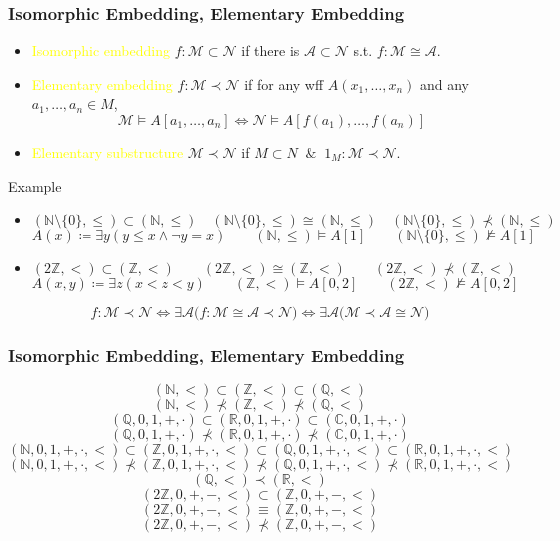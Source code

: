 \documentclass[UTF8,11pt,colorlinks,compress,openany]{beamer}%
\begin{document}
\begin{frame}\frametitle{Isomorphic Embedding, Elementary Embedding}
\setlength\abovedisplayskip{0pt}
\setlength\belowdisplayskip{0pt}
\begin{definition}
\begin{itemize}
	\item \textcolor{yellow}{Isomorphic embedding} $f:\mathcal{M}\subset\mathcal{N}$ if there is $\mathcal{A}\subset\mathcal{N}$ s.t. $f:\mathcal{M}\cong\mathcal{A}$.
	\item \textcolor{yellow}{Elementary embedding} $f:\mathcal{M}\prec\mathcal{N}$ if for any wff $A(x_1,\dots,x_n)$ and any $a_1,\dots,a_n\in M$,
	\[\mathcal{M}\vDash A[a_1,\dots,a_n]\iff\mathcal{N}\vDash A[f(a_1),\dots,f(a_n)]\]
	\item \textcolor{yellow}{Elementary substructure} $\mathcal{M}\prec\mathcal{N}$ if $M\subset N\;\;\&\;\;1_M:\mathcal{M}\prec\mathcal{N}$.
\end{itemize}
\end{definition}
\begin{block}{Example}
\begin{itemize}
	\item $(\mathbb{N}\setminus\{0\},\leq)\subset(\mathbb{N},\leq)\quad(\mathbb{N}\setminus\{0\},\leq)\cong(\mathbb{N},\leq)\quad(\mathbb{N}\setminus\{0\},\leq)\nprec(\mathbb{N},\leq)$
\[A(x)\coloneqq \exists y(y\leq x\wedge\neg y=x)\qquad(\mathbb{N},\leq)\vDash A[1]\qquad (\mathbb{N}\setminus\{0\},\leq)\nvDash A[1]\]
	\item $(2\mathbb{Z},<)\subset (\mathbb{Z},<)\qquad(2\mathbb{Z},<)\cong(\mathbb{Z},<)\qquad(2\mathbb{Z},<)\nprec(\mathbb{Z},<)$
	\[A(x,y)\coloneqq \exists z(x<z<y)\qquad(\mathbb{Z},<)\vDash A[0,2]\qquad(2\mathbb{Z},<)\nvDash A[0,2]\]
\end{itemize}
\end{block}
\[f:\mathcal{M}\prec\mathcal{N}\iff \exists \mathcal{A}\big(f:\mathcal{M}\cong\mathcal{A}\prec \mathcal{N}\big)\iff\exists \mathcal{A}\big(\mathcal{M}\prec\mathcal{A}\cong\mathcal{N}\big)\]
\end{frame}

\begin{frame}\frametitle{Isomorphic Embedding, Elementary Embedding}
\[(\mathbb{N},<)\subset(\mathbb{Z},<)\subset(\mathbb{Q},<)\]
\[(\mathbb{N},<)\nprec(\mathbb{Z},<)\nprec(\mathbb{Q},<)\]
\[(\mathbb{Q},0,1,+,\cdot)\subset(\mathbb{R},0,1,+,\cdot)\subset(\mathbb{C},0,1,+,\cdot)\]
\[(\mathbb{Q},0,1,+,\cdot)\nprec(\mathbb{R},0,1,+,\cdot)\nprec(\mathbb{C},0,1,+,\cdot)\]
\[(\mathbb{N},0,1,+,\cdot,<)\subset(\mathbb{Z},0,1,+,\cdot,<)\subset(\mathbb{Q},0,1,+,\cdot,<)\subset(\mathbb{R},0,1,+,\cdot,<)\]
\[(\mathbb{N},0,1,+,\cdot,<)\nprec(\mathbb{Z},0,1,+,\cdot,<)\nprec(\mathbb{Q},0,1,+,\cdot,<)\nprec(\mathbb{R},0,1,+,\cdot,<)\]
\[(\mathbb{Q},<)\prec(\mathbb{R},<)\]
\[(2\mathbb{Z},0,+,-,<)\subset(\mathbb{Z},0,+,-,<)\]
\[(2\mathbb{Z},0,+,-,<)\equiv(\mathbb{Z},0,+,-,<)\]
\[(2\mathbb{Z},0,+,-,<)\nprec(\mathbb{Z},0,+,-,<)\]
\end{frame}
\end{document}
